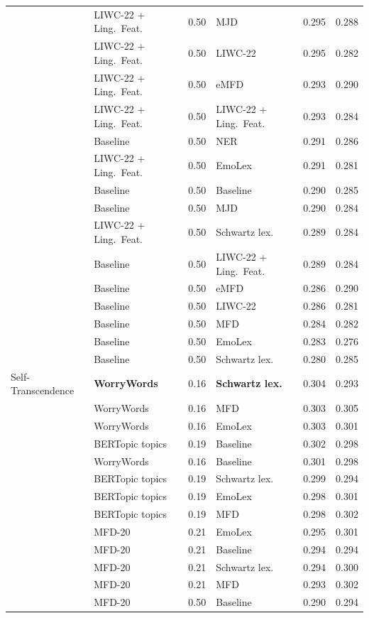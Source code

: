 {\begin{longtable}{llclcc}
 & LIWC-22 + Ling.\ Feat. & 0.50 & MJD & 0.295 & 0.288 \\
 & LIWC-22 + Ling.\ Feat. & 0.50 & LIWC-22 & 0.295 & 0.282 \\
 & LIWC-22 + Ling.\ Feat. & 0.50 & eMFD & 0.293 & 0.290 \\
 & LIWC-22 + Ling.\ Feat. & 0.50 & LIWC-22 + Ling.\ Feat. & 0.293 & 0.284 \\
 & Baseline & 0.50 & NER & 0.291 & 0.286 \\
 & LIWC-22 + Ling.\ Feat. & 0.50 & EmoLex & 0.291 & 0.281 \\
 & Baseline & 0.50 & Baseline & 0.290 & 0.285 \\
 & Baseline & 0.50 & MJD & 0.290 & 0.284 \\
 & LIWC-22 + Ling.\ Feat. & 0.50 & Schwartz lex. & 0.289 & 0.284 \\
 & Baseline & 0.50 & LIWC-22 + Ling.\ Feat. & 0.289 & 0.284 \\
 & Baseline & 0.50 & eMFD & 0.286 & 0.290 \\
 & Baseline & 0.50 & LIWC-22 & 0.286 & 0.281 \\
 & Baseline & 0.50 & MFD & 0.284 & 0.282 \\
 & Baseline & 0.50 & EmoLex & 0.283 & 0.276 \\
 & Baseline & 0.50 & Schwartz lex. & 0.280 & 0.285 \\
Self-Transcendence & \textbf{WorryWords} & 0.16 & \textbf{Schwartz lex.} & 0.304 & 0.293 \\
 & WorryWords & 0.16 & MFD & 0.303 & 0.305 \\
 & WorryWords & 0.16 & EmoLex & 0.303 & 0.301 \\
 & BERTopic topics & 0.19 & Baseline & 0.302 & 0.298 \\
 & WorryWords & 0.16 & Baseline & 0.301 & 0.298 \\
 & BERTopic topics & 0.19 & Schwartz lex. & 0.299 & 0.294 \\
 & BERTopic topics & 0.19 & EmoLex & 0.298 & 0.301 \\
 & BERTopic topics & 0.19 & MFD & 0.298 & 0.302 \\
 & MFD-20 & 0.21 & EmoLex & 0.295 & 0.301 \\
 & MFD-20 & 0.21 & Baseline & 0.294 & 0.294 \\
 & MFD-20 & 0.21 & Schwartz lex. & 0.294 & 0.300 \\
 & MFD-20 & 0.21 & MFD & 0.293 & 0.302 \\
 & MFD-20 & 0.50 & Baseline & 0.290 & 0.294 \\

\end{longtable}}
